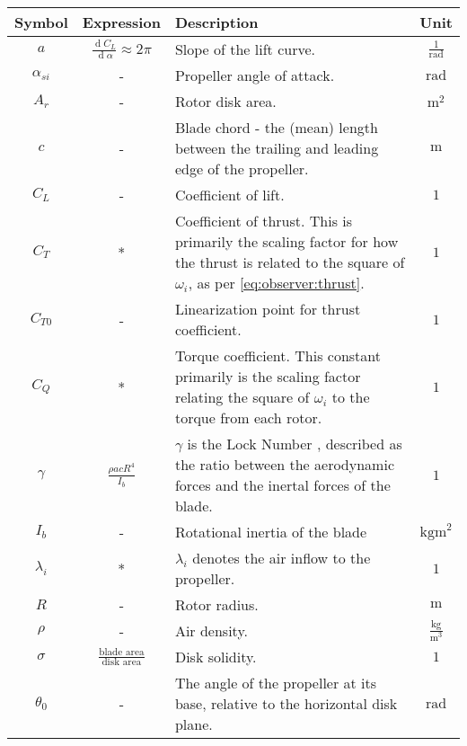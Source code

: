     \begin{table}
        \begin{tabularx}{\tablewidth}{|c|c|X|c|}\hline
            \textbf{Symbol} & \textbf{Expression} & \textbf{Description}  & \textbf{Unit} \\\hline
            $a$ & $\frac{\operatorname{d}\!C_{L}}{\operatorname{d}\!\alpha} \approx 2\pi$ & Slope of the lift curve. & $\frac{1}{\text{rad}}$ \\\hline
            $\alpha_{si}$ & - & Propeller angle of attack. & $\text{rad}$ \\\hline
            $A_{r}$ & - & Rotor disk area.   & $\text{m}^{2}$\\\hline
            $c$ & - & Blade chord - the (mean) length between the trailing and leading edge of the propeller.   & $\text{m}$ \\\hline
            $C_{L}$ & - & Coefficient of lift. & $1$ \\\hline
            $C_{T}$ & * & Coefficient of thrust. This is primarily the scaling factor for how the thrust is related to the square of $\omega_{i}$, as per \ref{eq:observer:thrust}.  & $1$\\\hline
            $C_{T0}$ & - & Linearization point for thrust coefficient.  & $1$\\\hline
            $C_{Q}$ & * & Torque coefficient. This constant primarily is the scaling factor relating the square of $\omega_{i}$ to the torque from each rotor. & $1$\\\hline
            $\gamma$ & $\frac{\rho a c R^{4}}{I_{b}}$ & $\gamma$ is the Lock Number \citep{leishman2002principles}, described as the ratio between the aerodynamic forces and the inertal forces of the blade.   & $1$ \\ \hline
            $I_{b}$ & - & Rotational inertia of the blade  & $\text{kgm}^{2}$\\\hline
            $\lambda_{i}$ & * & $\lambda_{i}$ denotes the air inflow to the propeller. & $1$ \\\hline
            $R$ & - & Rotor radius.   & $\text{m}$ \\\hline
            $\rho$ & - & Air density.   & $\frac{\text{kg}}{\text{m}^{3}}$ \\\hline
            $\sigma$ & $\frac{\text{blade area}}{\text{disk area}}$ & Disk solidity. & $1$ \\\hline
            $\theta_{0}$ & - & The angle of the propeller at its base, relative to the horizontal disk plane. & $\text{rad}$ \\\hline

\end{tabularx}
\end{table}
